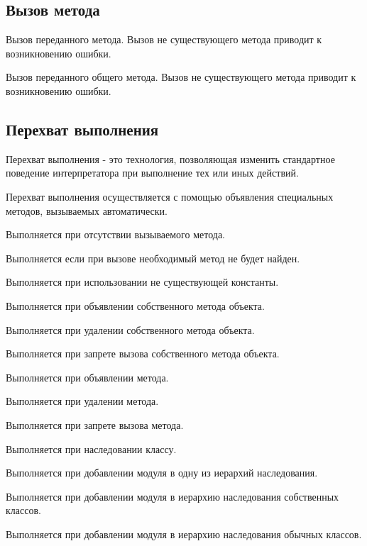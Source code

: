 \subsection{Вызов метода}

\begin{methodlist}
  Вызов переданного метода. Вызов не существующего метода приводит к возникновению ошибки. 
 
  Вызов переданного общего метода. Вызов не существующего метода приводит к возникновению ошибки.
\end{methodlist}

\subsection{Перехват выполнения}

Перехват выполнения - это технология, позволяющая изменить стандартное поведение интерпретатора при выполнение тех или иных действий.

Перехват выполнения осуществляется с помощью объявления специальных методов, вызываемых автоматически.

\begin{methodlist}
  Выполняется при отсутствии вызываемого метода. 

  Выполняется если при вызове  необходимый метод не будет найден.

  Выполняется при использовании не существующей константы.

  Выполняется при объявлении собственного метода объекта. 
 
  Выполняется при удалении собственного метода объекта. 
 
  Выполняется при запрете вызова собственного метода объекта.    

  Выполняется при объявлении метода. 
 
  Выполняется при удалении метода.
 
  Выполняется при запрете вызова метода. 

  Выполняется при наследовании классу.
 
  Выполняется при добавлении модуля в одну из иерархий наследования. 
 
  Выполняется при добавлении модуля в иерархию наследования собственных классов. 
 
  Выполняется при добавлении модуля в иерархию наследования обычных классов. 
\end{methodlist}

